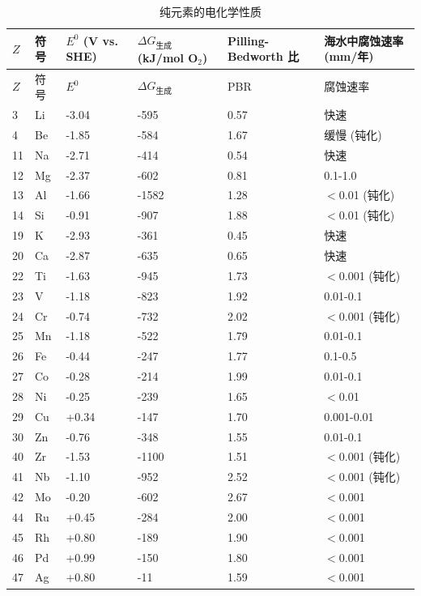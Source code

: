 \documentclass[12pt,a4paper]{article}
\begin{document}
	\begin{longtable}{p{0.8cm}p{1.2cm}p{2.5cm}p{2.5cm}p{2.5cm}p{2.5cm}}
		\caption{纯元素的电化学性质} \label{tab:electrochemical-properties-func} \\
		\toprule
		\(Z\) & 符号 & \(E^0\) (V vs. SHE) & \(\Delta G_{\text{生成}}\) (kJ/mol O\(_2\)) & Pilling-Bedworth 比 & 海水中腐蚀速率 (mm/年) \\
		\midrule
		\endfirsthead
		\toprule
		\(Z\) & 符号 & \(E^0\) & \(\Delta G_{\text{生成}}\) & PBR & 腐蚀速率 \\
		\midrule
		\endhead
		3  & Li & -3.04 & -595 & 0.57 & 快速 \\
		4  & Be & -1.85 & -584 & 1.67 & 缓慢 (钝化) \\
		11 & Na & -2.71 & -414 & 0.54 & 快速 \\
		12 & Mg & -2.37 & -602 & 0.81 & 0.1-1.0 \\
		13 & Al & -1.66 & -1582 & 1.28 & $<$0.01 (钝化) \\
		14 & Si & -0.91 & -907 & 1.88 & $<$0.01 (钝化) \\
		19 & K  & -2.93 & -361 & 0.45 & 快速 \\
		20 & Ca & -2.87 & -635 & 0.65 & 快速 \\
		22 & Ti & -1.63 & -945 & 1.73 & $<$0.001 (钝化) \\
		23 & V  & -1.18 & -823 & 1.92 & 0.01-0.1 \\
		24 & Cr & -0.74 & -732 & 2.02 & $<$0.001 (钝化) \\
		25 & Mn & -1.18 & -522 & 1.79 & 0.01-0.1 \\
		26 & Fe & -0.44 & -247 & 1.77 & 0.1-0.5 \\
		27 & Co & -0.28 & -214 & 1.99 & 0.01-0.1 \\
		28 & Ni & -0.25 & -239 & 1.65 & $<$0.01 \\
		29 & Cu & +0.34 & -147 & 1.70 & 0.001-0.01 \\
		30 & Zn & -0.76 & -348 & 1.55 & 0.01-0.1 \\
		40 & Zr & -1.53 & -1100 & 1.51 & $<$0.001 (钝化) \\
		41 & Nb & -1.10 & -952 & 2.52 & $<$0.001 (钝化) \\
		42 & Mo & -0.20 & -602 & 2.67 & $<$0.001 \\
		44 & Ru & +0.45 & -284 & 2.00 & $<$0.001 \\
		45 & Rh & +0.80 & -189 & 1.90 & $<$0.001 \\
		46 & Pd & +0.99 & -150 & 1.80 & $<$0.001 \\
		47 & Ag & +0.80 & -11 & 1.59 & $<$0.001 \\

\end{longtable}
\end{document}
